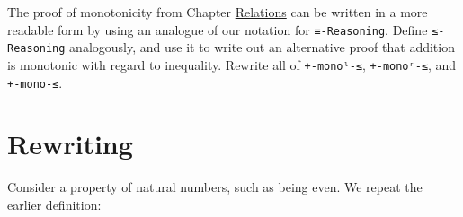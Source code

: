 The proof of monotonicity from Chapter
\protect\hyperlink{Relations}{Relations} can be written in a more
readable form by using an analogue of our notation for
\texttt{≡-Reasoning}. Define \texttt{≤-Reasoning} analogously, and use
it to write out an alternative proof that addition is monotonic with
regard to inequality. Rewrite all of \texttt{+-monoˡ-≤},
\texttt{+-monoʳ-≤}, and \texttt{+-mono-≤}.

\begin{fence}
\begin{code}%
\>[0]\<%
\end{code}
\end{fence}

\hypertarget{rewriting}{%
\section{Rewriting}\label{rewriting}}

Consider a property of natural numbers, such as being even. We repeat
the earlier definition:

